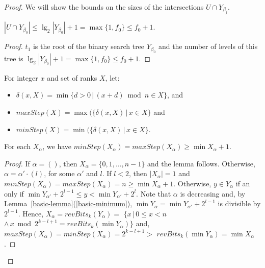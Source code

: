 \documentclass{llncs}
\begin{document}
\begin{proof}
We will show the bounds on the sizes of the intersections 
$U \cap Y_{\beta_j}$.
\begin{lemma}\label{first-level-lemma}
$|U \cap Y_{\beta_0}|\le \lg_2 | Y_{\beta_0} |+1=\max\{1,f_0\}\le f_0+1$.
\end{lemma}
% 
\begin{proof}
$t_1$ is the root of the binary search tree $Y_{\beta_0}$ and
the number of levels of this tree is $\lg_2 | Y_{\beta_0} |+1=\max\{1,f_0\}\le f_0+1$.
\end{proof}


For integer $x$ and set of ranks $X$, 
let:
\begin{itemize}
\item
  $\delta(x,X)= \min\{d>0\,|\, (x+d)\bmod n \in X\}$,
  and 
\item
  $maxStep(X)=\max(\{ \delta(x,X)\,|\, x\in X\}$
  and 
\item
  $minStep(X)=\min(\{ \delta(x,X)\,|\, x\in X\}$.
\end{itemize}
\begin{lemma}\label{step-lemma}
For each %
$X_\alpha$,
we have $minStep(X_\alpha)=maxStep(X_\alpha)\ge \min X_\alpha+1$.
\end{lemma}
\begin{proof}
If $\alpha=()$, then $X_\alpha=\{0,1,\ldots, n-1\}$ and the lemma follows.
Otherwise, $\alpha=\alpha'\cdot(l)$, for some $\alpha'$ and $l$.
If $l<2$, then $|X_\alpha|=1$ and $minStep(X_\alpha)=maxStep(X_\alpha)=n\ge \min X_\alpha+1$.
Otherwise,
 $y\in Y_\alpha$ if an only if $\min Y_{\alpha'}+2^{l-1}\le y<\min Y_{\alpha'}+2^l$.
Note that $\alpha$ is decreasing and,
by Lemma~\ref{basic-lemma}(\ref{basic-minimum}), 
$\min Y_\alpha=\min Y_{\alpha'}+2^{l-1}$ is divisible by $2^{l-1}$.
Hence, 
$X_\alpha=revBits_k(Y_\alpha)=$ 
$\{x\,|\, 0\le x< n\,$
$\wedge\, x\bmod 2^{k-l+1}=revBits_k(\min Y_{\alpha})\}$
and, 
$maxStep(X_\alpha)=minStep(X_\alpha)=2^{k-l+1}> $
$revBits_k(\min Y_{\alpha})=\min X_\alpha $.
\end{proof}


\end{proof}
\end{document}
